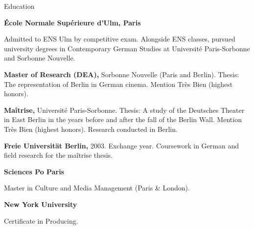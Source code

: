 \begin{rubric}{Education}

\entry*[2001--2005]%
\textbf{\'Ecole Normale Sup\'erieure d'Ulm, Paris}
\par
Admitted to ENS Ulm by competitive exam. Alongside ENS classes, pursued university degrees
in Contemporary German Studies at Universit\'e Paris-Sorbonne and Sorbonne Nouvelle.
\par
\textbf{Master of Research (DEA),} Sorbonne Nouvelle (Paris and Berlin).
Thesis: The representation of Berlin in German cinema. Mention Tr\`es Bien (highest honors).
\par
\textbf{Ma\^itrise,} Universit\'e Paris-Sorbonne.
Thesis: A study of the Deutsches Theater in East Berlin in the years before and after the
fall of the Berlin Wall. Mention Tr\`es Bien (highest honors). Research conducted in Berlin.
\par
\textbf{Freie Universit\"at Berlin,} 2003.
Exchange year. Coursework in German and field research for the ma\^itrise thesis.

\entry*[2001--2005]%
\textbf{Sciences Po Paris}
\par
Master in Culture and Media Management (Paris \& London).

\entry*[2009]%
\textbf{New York University}
\par
Certificate in Producing.

\end{rubric}
